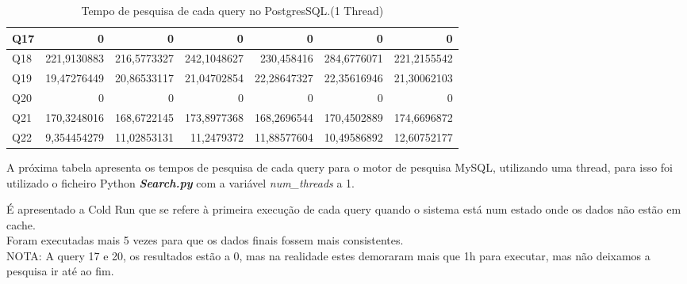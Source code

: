 \documentclass{article}
\begin{document}
\begin{table}[H]
{\begin{tabular}{|l|r|r|r|r|r|r|}
        Q17	&	0	&0&	0		&0 & 0 & 0\\ \hline
        Q18	&221,9130883	&216,5773327&	242,1048627&	230,458416	&284,6776071 &	221,2155542\\ \hline
        Q19	&19,47276449&	20,86533117	&21,04702854	&22,28647327&	22,35616946&	21,30062103\\ \hline
        Q20	&	0	&0&	0		&0 & 0 & 0\\ \hline
        Q21&	170,3248016&		168,6722145	&	173,8977368&		168,2696544	&	170,4502889	&	174,6696872\\ \hline
        Q22	&9,354454279&	11,02853131	&11,2479372&	11,88577604&	10,49586892	&12,60752177\\ \hline
      \end{tabular}}
      
    \caption{Tempo de pesquisa de cada query no PostgresSQL.(1 Thread)}
    \label{tab:BC_Table3}
  \end{table}
\clearpage

\texttt{}\par A próxima tabela apresenta os tempos de pesquisa de cada query para o motor de pesquisa MySQL, utilizando uma thread, para isso foi utilizado o ficheiro Python \textbf{\textit{Search.py}}  com a variável \textit{num\_threads} a 1. 
\texttt{}\par É apresentado a Cold Run que se refere à primeira execução de cada query quando o sistema está num estado onde os dados não estão em cache.\\
Foram executadas mais 5 vezes para que os dados finais fossem mais consistentes.\\
NOTA: A query 17 e 20, os resultados estão a 0, mas na realidade estes demoraram mais que 1h para executar, mas não deixamos a pesquisa ir até ao fim.
\end{document}
